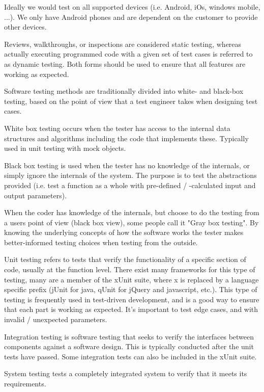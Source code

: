 Ideally we would test on all supported devices (i.e. Android,
iOs, windows mobile, ...). We only have Android phones and are dependent on the
customer to provide other devices.

Reviews, walkthroughs, or inspections are considered static testing, whereas
actually executing programmed code with a given set of test cases is referred to
as dynamic testing. Both forms should be used to ensure that all features are
working as expected.

Software testing methods are traditionally divided into white- and black-box
testing, based on the point of view that a test engineer takes when designing
test cases.

White box testing occurs when the tester has access to the internal data
structures and algorithms including the code that implements these. Typically
used in unit testing with mock objects.

Black box testing is used when the tester has no knowledge of the internals, or
simply ignore the internals of the system. The purpose is to test the
abstractions provided (i.e. test a function as a whole with
pre-defined / -calculated input and output parameters).

When the coder has knowledge of the internals, but choose to do the testing from
a users point of view (black box view), some people call it "Gray box testing".
By knowing the underlying concepts of how the software works the tester makes
better-informed testing choices when testing from the outside.

Unit testing refers to tests that verify the functionality of a specific section
of code, usually at the function level. There exist many frameworks for this
type of testing, many are a member of the xUnit suite, where x is replaced by a
language specific prefix (jUnit for java, qUnit for jQuery and javascript, etc.).  
This type of testing is frequently used in test-driven development, and is a
good way to ensure that each part is working as expected. It's important to test
edge cases, and with invalid / unexpected parameters.

Integration testing is software testing that seeks to verify the interfaces
between components against a software design. This is typically conducted after
the unit tests have passed. Some integration tests can also be included in the
xUnit suite.

System testing tests a completely integrated system to verify that it meets its
requirements.

